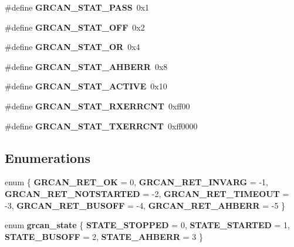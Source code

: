 \begin{DoxyCompactItemize}
\#define {\bfseries G\+R\+C\+A\+N\+\_\+\+S\+T\+A\+T\+\_\+\+P\+A\+SS}~0x1
\item 
\mbox{\label{group__can_ga26887adca5353f78b9518804883103b4}} 
\#define {\bfseries G\+R\+C\+A\+N\+\_\+\+S\+T\+A\+T\+\_\+\+O\+FF}~0x2
\item 
\mbox{\label{group__can_ga823d6f7696d0c3100ca9e52f74473106}} 
\#define {\bfseries G\+R\+C\+A\+N\+\_\+\+S\+T\+A\+T\+\_\+\+OR}~0x4
\item 
\mbox{\label{group__can_gadd7ec3546c015f169d8f9aa51de4e3a5}} 
\#define {\bfseries G\+R\+C\+A\+N\+\_\+\+S\+T\+A\+T\+\_\+\+A\+H\+B\+E\+RR}~0x8
\item 
\mbox{\label{group__can_ga7e8bfbc8f25833d8170637d9fcd83474}} 
\#define {\bfseries G\+R\+C\+A\+N\+\_\+\+S\+T\+A\+T\+\_\+\+A\+C\+T\+I\+VE}~0x10
\item 
\mbox{\label{group__can_ga37389b91498044233753479eaa86c1aa}} 
\#define {\bfseries G\+R\+C\+A\+N\+\_\+\+S\+T\+A\+T\+\_\+\+R\+X\+E\+R\+R\+C\+NT}~0xff00
\item 
\mbox{\label{group__can_ga0c2dbe00758301154ca4258c65f079de}} 
\#define {\bfseries G\+R\+C\+A\+N\+\_\+\+S\+T\+A\+T\+\_\+\+T\+X\+E\+R\+R\+C\+NT}~0xff0000
\end{DoxyCompactItemize}
\subsection*{Enumerations}
\begin{DoxyCompactItemize}
\item 
\mbox{\label{group__can_ga2f1398dba5e4a5616b83437528bdb28e}} 
enum \{ \newline
{\bfseries G\+R\+C\+A\+N\+\_\+\+R\+E\+T\+\_\+\+OK} = 0, 
{\bfseries G\+R\+C\+A\+N\+\_\+\+R\+E\+T\+\_\+\+I\+N\+V\+A\+RG} = -\/1, 
{\bfseries G\+R\+C\+A\+N\+\_\+\+R\+E\+T\+\_\+\+N\+O\+T\+S\+T\+A\+R\+T\+ED} = -\/2, 
{\bfseries G\+R\+C\+A\+N\+\_\+\+R\+E\+T\+\_\+\+T\+I\+M\+E\+O\+UT} = -\/3, 
\newline
{\bfseries G\+R\+C\+A\+N\+\_\+\+R\+E\+T\+\_\+\+B\+U\+S\+O\+FF} = -\/4, 
{\bfseries G\+R\+C\+A\+N\+\_\+\+R\+E\+T\+\_\+\+A\+H\+B\+E\+RR} = -\/5
 \}
\item 
\mbox{\label{group__can_ga6c188112484eb85c674abe637d9822cd}} 
enum {\bfseries grcan\+\_\+state} \{ {\bfseries S\+T\+A\+T\+E\+\_\+\+S\+T\+O\+P\+P\+ED} = 0, 
{\bfseries S\+T\+A\+T\+E\+\_\+\+S\+T\+A\+R\+T\+ED} = 1, 
{\bfseries S\+T\+A\+T\+E\+\_\+\+B\+U\+S\+O\+FF} = 2, 
{\bfseries S\+T\+A\+T\+E\+\_\+\+A\+H\+B\+E\+RR} = 3
 \}
\end{DoxyCompactItemize}
